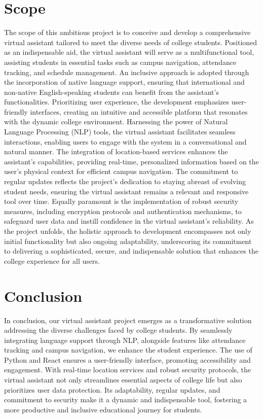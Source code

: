 \documentclass[12pt,a4paper]{report}
\begin{document}
\section{Scope}
The scope of this ambitious project is to conceive and develop a comprehensive virtual assistant tailored to meet the diverse needs of college students. Positioned as an indispensable aid, the virtual assistant will serve as a multifunctional tool, assisting students in essential tasks such as campus navigation, attendance tracking, and schedule management. An inclusive approach is adopted through the incorporation of native language support, ensuring that international and non-native English-speaking students can benefit from the assistant's functionalities. Prioritizing user experience, the development emphasizes user-friendly interfaces, creating an intuitive and accessible platform that resonates with the dynamic college environment. Harnessing the power of Natural Language Processing (NLP) tools, the virtual assistant facilitates seamless interactions, enabling users to engage with the system in a conversational and natural manner. The integration of location-based services enhances the assistant's capabilities, providing real-time, personalized information based on the user's physical context for efficient campus navigation. The commitment to regular updates reflects the project's dedication to staying abreast of evolving student needs, ensuring the virtual assistant remains a relevant and responsive tool over time. Equally paramount is the implementation of robust security measures, including encryption protocols and authentication mechanisms, to safeguard user data and instill confidence in the virtual assistant's reliability. As the project unfolds, the holistic approach to development encompasses not only initial functionality but also ongoing adaptability, underscoring its commitment to delivering a sophisticated, secure, and indispensable solution that enhances the college experience for all users.

\section{Conclusion}
In conclusion, our virtual assistant project emerges as a transformative solution addressing the diverse challenges faced by college students. By seamlessly integrating language support through NLP, alongside features like attendance tracking and campus navigation, we enhance the student experience. The use of Python and React ensures a user-friendly interface, promoting accessibility and engagement. With real-time location services and robust security protocols, the virtual assistant not only streamlines essential aspects of college life but also prioritizes user data protection. Its adaptability, regular updates, and commitment to security make it a dynamic and indispensable tool, fostering a more productive and inclusive educational journey for students.
\end{document}
